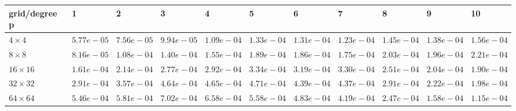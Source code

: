 \begin{tabular}{lllllllllll}
\hline
 grid/degree p   & 1          & 2          & 3          & 4          & 5          & 6          & 7          & 8          & 9          & 10         \\
\hline
 $4 \times 4$    & $5.77e-05$ & $7.56e-05$ & $9.94e-05$ & $1.09e-04$ & $1.33e-04$ & $1.31e-04$ & $1.23e-04$ & $1.45e-04$ & $1.38e-04$ & $1.56e-04$ \\
 $8 \times 8$    & $8.16e-05$ & $1.08e-04$ & $1.40e-04$ & $1.55e-04$ & $1.89e-04$ & $1.86e-04$ & $1.75e-04$ & $2.03e-04$ & $1.96e-04$ & $2.21e-04$ \\
 $16 \times 16$  & $1.61e-04$ & $2.14e-04$ & $2.77e-04$ & $2.92e-04$ & $3.34e-04$ & $3.19e-04$ & $3.30e-04$ & $2.51e-04$ & $2.04e-04$ & $1.90e-04$ \\
 $32 \times 32$  & $2.91e-04$ & $3.57e-04$ & $4.64e-04$ & $4.65e-04$ & $4.71e-04$ & $4.39e-04$ & $4.37e-04$ & $2.91e-04$ & $2.22e-04$ & $1.98e-04$ \\
 $64 \times 64$  & $5.46e-04$ & $5.81e-04$ & $7.02e-04$ & $6.58e-04$ & $5.58e-04$ & $4.83e-04$ & $4.19e-04$ & $2.47e-04$ & $1.58e-04$ & $1.15e-04$ \\
\hline
\end{tabular}